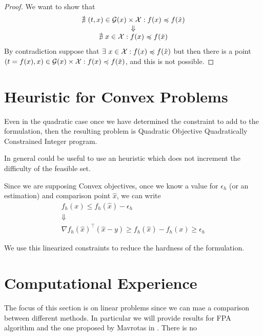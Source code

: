 \documentclass{article}
\def\X{{\cal X}}
\begin{document}
\begin{proof}
	    	 We want to show that 
	    	 $$
	    	 \begin{array}{c}
	    	 \nexists\ (t,x) \in {\cal G}(x)\times \X : f(x) \preccurlyeq  f(\hat{x})\\
	    	 \Downarrow\\
	    	 \nexists\ x \in \X : f(x) \preccurlyeq  f(\hat{x})
	    	 \end{array}
	    	 $$
	    	 By contradiction suppose that $\exists\ x \in \X : f(x) \preccurlyeq  f(\hat{x})$ but then there is a point $(t=f(x), x) \in {\cal G}(x) \times \X : f(x) \preccurlyeq f(\hat{x})$, and this is not possible.
	    \end{proof}
	    
	    
	    \section{Heuristic for Convex Problems}
	    Even in the quadratic case once we have determined the constraint to add to the formulation, then the resulting problem is Quadratic Objective Quadratically Constrained Integer program.
	    
	    In general could be useful to use an heuristic which does not increment the difficulty of the feasible set.
	    
	    Since we are supposing Convex objectives, once we know a value for $\epsilon_h$ (or an estimation) and comparison point $\hat{x}$, we can write
	    $$
	    \begin{array}{c}
	    f_h(x) \le f_h(\hat{x}) - \epsilon_h\\\Downarrow\\
	    \nabla f_h(\hat{x})^\intercal \left(\hat{x} - y \right) \ge f_h(\hat{x}) - f_h(x)\ge \epsilon_h
	    \end{array}
	    $$
	    
	    We use this linearized constraints to reduce the hardness of the formulation.
	    
	    \section{Computational Experience}
	    
	    The focus of this section is on linear problems since we can mae a comparison between different methods. In particular we will provide results for FPA algorithm and the one proposed by Mavrotas in \cite{calippo}. There is no 
	    
\end{document}

